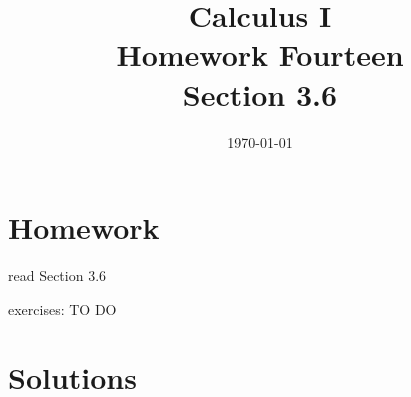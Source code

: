 \documentclass[letterpaper, landscape]{exam}
\title{Calculus I \\ Homework Fourteen \\ Section 3.6}
\author{}
\date{\today}
\begin{document}
  \maketitle

  \section{Homework}
    \begin{itemize*}
      \item read Section 3.6
      \item exercises: TO DO
    \end{itemize*}

  \ifprintanswers

  \section{Solutions}
\end{document}
